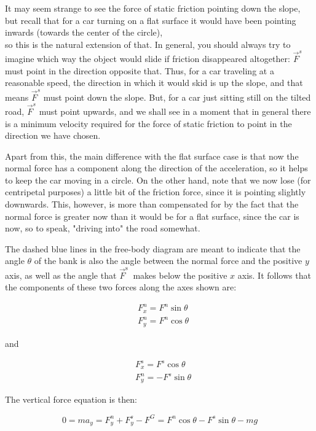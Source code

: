 \documentclass[10pt]{article}
\begin{document}
It may seem strange to see the force of static friction pointing down the slope, but recall that for a car turning on a flat surface it would have been pointing inwards (towards the center of the circle),\\
so this is the natural extension of that. In general, you should always try to imagine which way the object would slide if friction disappeared altogether: $\vec{F}^{s}$ must point in the direction opposite that. Thus, for a car traveling at a reasonable speed, the direction in which it would skid is up the slope, and that means $\vec{F}^{s}$ must point down the slope. But, for a car just sitting still on the tilted road, $\vec{F}^{s}$ must point upwards, and we shall see in a moment that in general there is a minimum velocity required for the force of static friction to point in the direction we have chosen.

Apart from this, the main difference with the flat surface case is that now the normal force has a component along the direction of the acceleration, so it helps to keep the car moving in a circle. On the other hand, note that we now lose (for centripetal purposes) a little bit of the friction force, since it is pointing slightly downwards. This, however, is more than compensated for by the fact that the normal force is greater now than it would be for a flat surface, since the car is now, so to speak, "driving into" the road somewhat.

The dashed blue lines in the free-body diagram are meant to indicate that the angle $\theta$ of the bank is also the angle between the normal force and the positive $y$ axis, as well as the angle that $\vec{F}^{\text {s }}$ makes below the positive $x$ axis. It follows that the components of these two forces along the axes shown are:


\begin{align*}
& F_{x}^{n}=F^{n} \sin \theta \\
& F_{y}^{n}=F^{n} \cos \theta \tag{8.55}
\end{align*}


and


\begin{align*}
& F_{x}^{s}=F^{s} \cos \theta \\
& F_{y}^{n}=-F^{s} \sin \theta \tag{8.56}
\end{align*}


The vertical force equation is then:


\begin{equation*}
0=m a_{y}=F_{y}^{n}+F_{y}^{s}-F^{G}=F^{n} \cos \theta-F^{s} \sin \theta-m g \tag{8.57}
\end{equation*}
\end{document}
